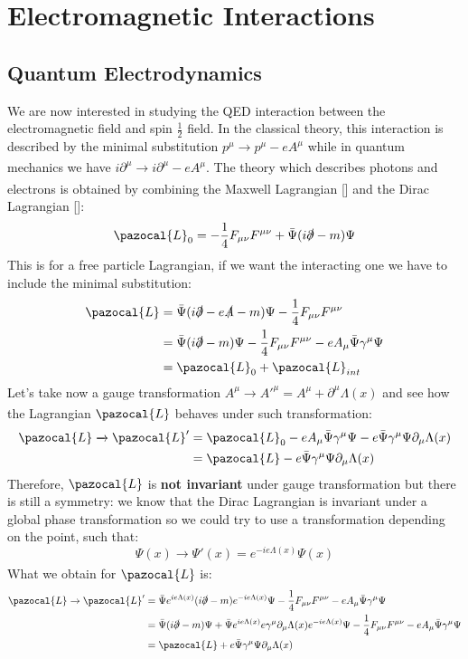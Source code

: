 \documentclass[../main.tex]{subfiles}
\begin{document}
\setchapterpreamble[u]{\margintoc}
\chapter[Electromagnetic Interactions]{Electromagnetic Interactions\footnotemark[0]}
\section{Quantum Electrodynamics}
We are now interested in studying the QED interaction between the electromagnetic field and spin $\frac{1}{2}$ field. In the classical theory, this interaction is described by the minimal substitution $p^\mu\xrightarrow[]{}p^\mu-eA^\mu$ while in quantum mechanics we have $i\partial^\mu\xrightarrow[]{}i\partial^\mu-eA^\mu$. The theory which describes photons and electrons is obtained by combining the Maxwell Lagrangian [] and the Dirac Lagrangian []:
\[
\pazocal{L}_0=-\frac{1}{4}F_{\mu\nu}F^{\mu\nu}+\bar{\Psi}(i\slashed{\partial}-m)\Psi
\]
This is for a free particle Lagrangian, if we want the interacting one we have to include the minimal substitution:
\begin{align*}
\pazocal{L}&=\bar{\Psi}(i\slashed{\partial}-e\slashed{A}-m)\Psi-\frac{1}{4}F_{\mu\nu}F^{\mu\nu}\\
&=\bar{\Psi}(i\slashed{\partial}-m)\Psi-\frac{1}{4}F_{\mu\nu}F^{\mu\nu}-eA_\mu\bar{\Psi}\gamma^\mu\Psi\\
&=\pazocal{L}_0+\pazocal{L}_{int}
\end{align*}
Let's take now a gauge transformation $A^\mu\xrightarrow[]{}A'^\mu=A^\mu+\partial^\mu\Lambda(x)$ and see how the Lagrangian $\pazocal{L}$ behaves under such transformation:
\begin{align*}
\pazocal{L}\xrightarrow[]{}\pazocal{L}'&=\pazocal{L}_0-eA_\mu\bar{\Psi}\gamma^\mu\Psi-e\bar{\Psi}\gamma^\mu\Psi\partial_\mu\Lambda(x)\\
&=\pazocal{L}-e\bar{\Psi}\gamma^\mu\Psi\partial_\mu\Lambda(x)
\end{align*}
Therefore, $\pazocal{L}$ is \textbf{not invariant} under gauge transformation but there is still a symmetry: we know that the Dirac Lagrangian is invariant under a global phase transformation so we could try to use a transformation depending on the point, such that:
\[
\Psi(x)\xrightarrow[]{}\Psi'(x)=e^{-ie\Lambda(x)}\Psi(x)
\]
What we obtain for $\pazocal{L}$ is:
\begin{align*}
\pazocal{L}\xrightarrow[]{}\pazocal{L}'&=\bar{\Psi}e^{ie\Lambda(x)}(i\slashed{\partial}-m)e^{-ie\Lambda(x)}\Psi-\frac{1}{4}F_{\mu\nu}F^{\mu\nu}-eA_\mu\bar{\Psi}\gamma^\mu\Psi\\
&=\bar{\Psi}(i\slashed{\partial}-m)\Psi+\bar{\Psi}e^{ie\Lambda(x)}e\gamma^\mu\partial_\mu\Lambda(x)e^{-ie\Lambda(x)}\Psi-\frac{1}{4}F_{\mu\nu}F^{\mu\nu}-eA_\mu\bar{\Psi}\gamma^\mu\Psi\\
&=\pazocal{L}+e\bar{\Psi}\gamma^\mu\Psi\partial_\mu\Lambda(x)
\end{align*}
\end{document}

